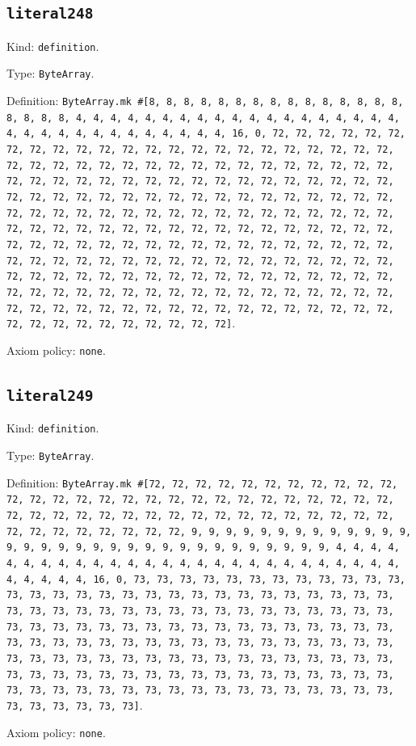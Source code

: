 \documentclass[11pt]{article}
\begin{document}
\subsection*{\texttt{literal248}}
\noindent Kind: \texttt{definition}.\par
\noindent Type: \texttt{ByteArray}.\par
\noindent Definition: \texttt{ByteArray.mk \#[8, 8, 8, 8, 8, 8, 8, 8, 8, 8, 8, 8, 8, 8, 8, 8, 8, 8, 8, 4, 4, 4, 4, 4, 4, 4, 4, 4, 4, 4, 4, 4, 4, 4, 4, 4, 4, 4, 4, 4, 4, 4, 4, 4, 4, 4, 4, 4, 4, 4, 4, 16, 0, 72, 72, 72, 72, 72, 72, 72, 72, 72, 72, 72, 72, 72, 72, 72, 72, 72, 72, 72, 72, 72, 72, 72, 72, 72, 72, 72, 72, 72, 72, 72, 72, 72, 72, 72, 72, 72, 72, 72, 72, 72, 72, 72, 72, 72, 72, 72, 72, 72, 72, 72, 72, 72, 72, 72, 72, 72, 72, 72, 72, 72, 72, 72, 72, 72, 72, 72, 72, 72, 72, 72, 72, 72, 72, 72, 72, 72, 72, 72, 72, 72, 72, 72, 72, 72, 72, 72, 72, 72, 72, 72, 72, 72, 72, 72, 72, 72, 72, 72, 72, 72, 72, 72, 72, 72, 72, 72, 72, 72, 72, 72, 72, 72, 72, 72, 72, 72, 72, 72, 72, 72, 72, 72, 72, 72, 72, 72, 72, 72, 72, 72, 72, 72, 72, 72, 72, 72, 72, 72, 72, 72, 72, 72, 72, 72, 72, 72, 72, 72, 72, 72, 72, 72, 72, 72, 72, 72, 72, 72, 72, 72, 72, 72, 72, 72, 72, 72, 72, 72, 72, 72, 72, 72, 72, 72, 72, 72, 72, 72, 72, 72, 72, 72, 72, 72, 72, 72, 72, 72, 72, 72, 72, 72, 72, 72, 72, 72, 72, 72, 72, 72, 72, 72]}.\par
\noindent Axiom policy: \texttt{none}.\par
\subsection*{\texttt{literal249}}
\noindent Kind: \texttt{definition}.\par
\noindent Type: \texttt{ByteArray}.\par
\noindent Definition: \texttt{ByteArray.mk \#[72, 72, 72, 72, 72, 72, 72, 72, 72, 72, 72, 72, 72, 72, 72, 72, 72, 72, 72, 72, 72, 72, 72, 72, 72, 72, 72, 72, 72, 72, 72, 72, 72, 72, 72, 72, 72, 72, 72, 72, 72, 72, 72, 72, 72, 72, 72, 72, 72, 72, 72, 72, 72, 9, 9, 9, 9, 9, 9, 9, 9, 9, 9, 9, 9, 9, 9, 9, 9, 9, 9, 9, 9, 9, 9, 9, 9, 9, 9, 9, 9, 9, 9, 9, 9, 4, 4, 4, 4, 4, 4, 4, 4, 4, 4, 4, 4, 4, 4, 4, 4, 4, 4, 4, 4, 4, 4, 4, 4, 4, 4, 4, 4, 4, 4, 4, 4, 16, 0, 73, 73, 73, 73, 73, 73, 73, 73, 73, 73, 73, 73, 73, 73, 73, 73, 73, 73, 73, 73, 73, 73, 73, 73, 73, 73, 73, 73, 73, 73, 73, 73, 73, 73, 73, 73, 73, 73, 73, 73, 73, 73, 73, 73, 73, 73, 73, 73, 73, 73, 73, 73, 73, 73, 73, 73, 73, 73, 73, 73, 73, 73, 73, 73, 73, 73, 73, 73, 73, 73, 73, 73, 73, 73, 73, 73, 73, 73, 73, 73, 73, 73, 73, 73, 73, 73, 73, 73, 73, 73, 73, 73, 73, 73, 73, 73, 73, 73, 73, 73, 73, 73, 73, 73, 73, 73, 73, 73, 73, 73, 73, 73, 73, 73, 73, 73, 73, 73, 73, 73, 73, 73, 73, 73, 73, 73, 73, 73, 73, 73, 73, 73, 73, 73, 73, 73, 73]}.\par
\noindent Axiom policy: \texttt{none}.\par
\end{document}

